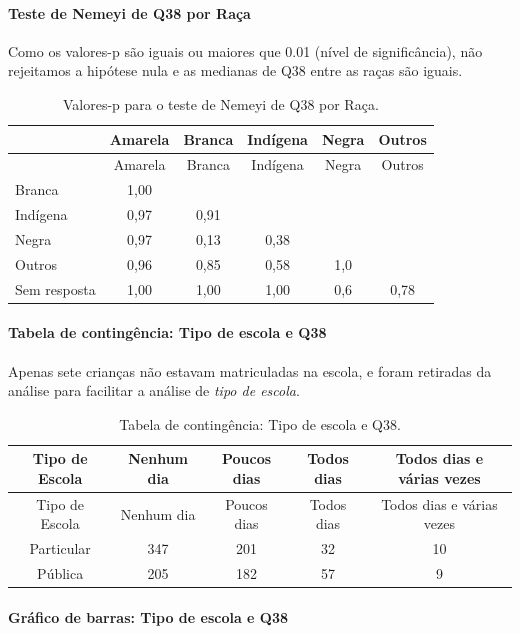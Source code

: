 \documentclass[]{article}
\let\oldparagraph\paragraph
\renewcommand{\paragraph}[1]{\oldparagraph{#1}\mbox{}}
\begin{document}
\hypertarget{teste-de-nemeyi-de-q38-por-rauxe7a}{%
\paragraph{Teste de Nemeyi de Q38 por Raça}\label{teste-de-nemeyi-de-q38-por-rauxe7a}}

Como os valores-p são iguais ou maiores que 0.01 (nível de significância), não rejeitamos a hipótese nula e as medianas de Q38 entre as raças são iguais.

\begin{longtable}[]{@{}lccccc@{}}
\caption{\label{tab:unnamed-chunk-1468}Valores-p para o teste de Nemeyi de Q38 por Raça.}\tabularnewline
\toprule
& Amarela & Branca & Indígena & Negra & Outros\tabularnewline
\midrule
\endfirsthead
\toprule
& Amarela & Branca & Indígena & Negra & Outros\tabularnewline
\midrule
\endhead
Branca & 1,00 & & & &\tabularnewline
Indígena & 0,97 & 0,91 & & &\tabularnewline
Negra & 0,97 & 0,13 & 0,38 & &\tabularnewline
Outros & 0,96 & 0,85 & 0,58 & 1,0 &\tabularnewline
Sem resposta & 1,00 & 1,00 & 1,00 & 0,6 & 0,78\tabularnewline
\bottomrule
\end{longtable}

\cleardoublepage

\hypertarget{tabela-de-continguxeancia-tipo-de-escola-e-q38}{%
\paragraph{Tabela de contingência: Tipo de escola e Q38}\label{tabela-de-continguxeancia-tipo-de-escola-e-q38}}

Apenas sete crianças não estavam matriculadas na escola, e foram retiradas da análise para facilitar a análise de \emph{tipo de escola}.

\begin{longtable}[]{@{}ccccc@{}}
\caption{\label{tab:unnamed-chunk-1469}Tabela de contingência: Tipo de escola e Q38.}\tabularnewline
\toprule
Tipo de Escola & Nenhum dia & Poucos dias & Todos dias & Todos dias e várias vezes\tabularnewline
\midrule
\endfirsthead
\toprule
Tipo de Escola & Nenhum dia & Poucos dias & Todos dias & Todos dias e várias vezes\tabularnewline
\midrule
\endhead
Particular & 347 & 201 & 32 & 10\tabularnewline
Pública & 205 & 182 & 57 & 9\tabularnewline
\bottomrule
\end{longtable}

\hypertarget{gruxe1fico-de-barras-tipo-de-escola-e-q38}{%
\paragraph{Gráfico de barras: Tipo de escola e Q38}\label{gruxe1fico-de-barras-tipo-de-escola-e-q38}}
\end{document}
